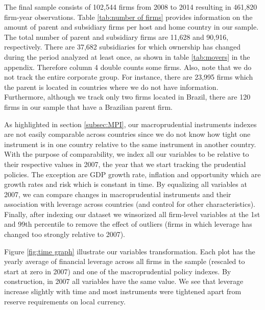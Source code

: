 \documentclass[12pt]{article}
\begin{document}
	The final sample consists of 102,544 firms from 2008 to 2014 resulting in 461,820 firm-year observations. Table \ref{tab:number of firms} provides information on the amount of parent and subsidiary firms per host and home country in our sample. The total number of parent and subsidiary firms are 11,628 and 90,916, respectively. There are 37,682 subsidiaries for which ownership has changed during the period analyzed at least once, as shown in table \ref{tab:movers} in the appendix. Therefore column 4 double counts some firms. Also, note that we do not track the entire corporate group. For instance, there are 23,995 firms which the parent is located in countries where we do not have information. Furthermore, although we track only two firms located in Brazil, there are 120 firms in our sample that have a Brazilian parent firm.  
	
		\begin{small}
		{
			
		}
	\end{small}

	
	As highlighted in section \ref{subsec:MPI}, our macroprudential instruments indexes are not easily comparable across countries since we do not know how tight one instrument is in one country relative to the same instrument in another country. With the purpose of comparability, we index all our variables to be relative to their respective values in 2007, the year that we start tracking the prudential policies. The exception are GDP growth rate, inflation and opportunity which are growth rates and risk which is constant in time. By equalizing all variables at 2007, we can compare changes in macroprudential instruments and their association with leverage across countries (and control for other characteristics). Finally, after indexing our dataset we winsorized all firm-level variables at the 1st and 99th percentile to remove the effect of outliers (firms in which leverage has changed too strongly relative to 2007). 
	
	Figure \ref{fig:time graph} illustrate our variables transformation. Each plot has the yearly average of financial leverage across all firms in the sample (rescaled to start at zero in 2007) and one of the macroprudential policy indexes. By construction, in 2007 all variables have the same value. We see that leverage increase slightly with time and most instruments were tightened apart from reserve requirements on local currency.   
	
\end{document}
